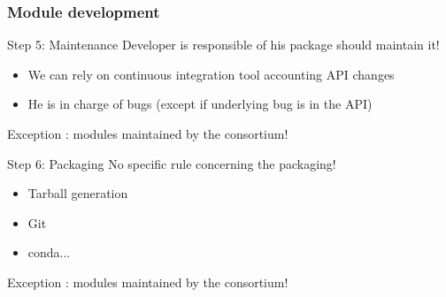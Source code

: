 \documentclass[8pt]{beamer}
\begin{document}
\begin{frame}
  \frametitle{Module development}
  \begin{block}{Step 5: Maintenance}
    Developer is responsible of his package should maintain it!
    \begin{itemize}
    \item We can rely on continuous integration tool accounting API changes
    \item He is in charge of bugs (except if underlying bug is in the API)
    \end{itemize}
    Exception : modules maintained by the consortium!
  \end{block}
  \begin{block}{Step 6: Packaging}
    No specific rule concerning the packaging!
    \begin{itemize}
    \item Tarball generation
    \item Git
    \item conda...
    \end{itemize}
    Exception : modules maintained by the consortium!
  \end{block}
\end{frame}
\end{document}
